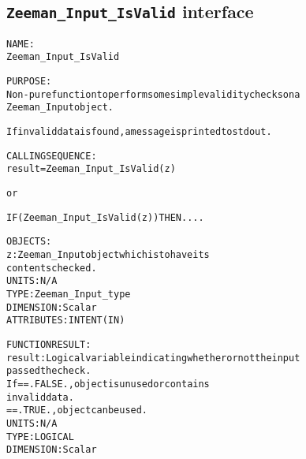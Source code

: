 \subsection{\texttt{Zeeman\_Input\_IsValid} interface}
  \label{sec:Zeeman_Input_IsValid_interface}
  \begin{alltt}
 
  NAME:
        Zeeman_Input_IsValid
 
  PURPOSE:
        Non-pure function to perform some simple validity checks on a
        Zeeman_Input object.
 
        If invalid data is found, a message is printed to stdout.
 
  CALLING SEQUENCE:
        result = Zeeman_Input_IsValid( z )
 
          or
 
        IF ( Zeeman_Input_IsValid( z ) ) THEN....
 
  OBJECTS:
        z:         Zeeman_Input object which is to have its
                   contents checked.
                   UNITS:      N/A
                   TYPE:       Zeeman_Input_type
                   DIMENSION:  Scalar
                   ATTRIBUTES: INTENT(IN)
 
  FUNCTION RESULT:
        result:    Logical variable indicating whether or not the input
                   passed the check.
                   If == .FALSE., object is unused or contains
                                  invalid data.
                      == .TRUE.,  object can be used.
                   UNITS:      N/A
                   TYPE:       LOGICAL
                   DIMENSION:  Scalar
 
  \end{alltt}

